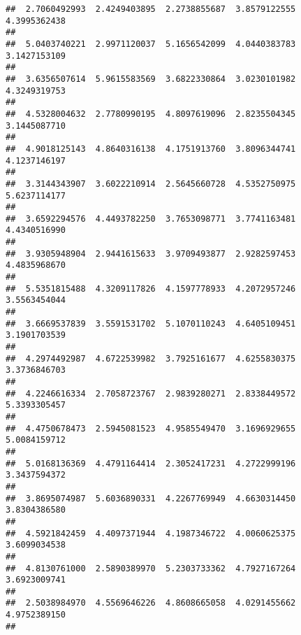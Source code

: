 \documentclass[]{article}
\begin{document}
\begin{verbatim}
##  2.7060492993  2.4249403895  2.2738855687  3.8579122555  4.3995362438 
##                                                                       
##  5.0403740221  2.9971120037  5.1656542099  4.0440383783  3.1427153109 
##                                                                       
##  3.6356507614  5.9615583569  3.6822330864  3.0230101982  4.3249319753 
##                                                                       
##  4.5328004632  2.7780990195  4.8097619096  2.8235504345  3.1445087710 
##                                                                       
##  4.9018125143  4.8640316138  4.1751913760  3.8096344741  4.1237146197 
##                                                                       
##  3.3144343907  3.6022210914  2.5645660728  4.5352750975  5.6237114177 
##                                                                       
##  3.6592294576  4.4493782250  3.7653098771  3.7741163481  4.4340516990 
##                                                                       
##  3.9305948904  2.9441615633  3.9709493877  2.9282597453  4.4835968670 
##                                                                       
##  5.5351815488  4.3209117826  4.1597778933  4.2072957246  3.5563454044 
##                                                                       
##  3.6669537839  3.5591531702  5.1070110243  4.6405109451  3.1901703539 
##                                                                       
##  4.2974492987  4.6722539982  3.7925161677  4.6255830375  3.3736846703 
##                                                                       
##  4.2246616334  2.7058723767  2.9839280271  2.8338449572  5.3393305457 
##                                                                       
##  4.4750678473  2.5945081523  4.9585549470  3.1696929655  5.0084159712 
##                                                                       
##  5.0168136369  4.4791164414  2.3052417231  4.2722999196  3.3437594372 
##                                                                       
##  3.8695074987  5.6036890331  4.2267769949  4.6630314450  3.8304386580 
##                                                                       
##  4.5921842459  4.4097371944  4.1987346722  4.0060625375  3.6099034538 
##                                                                       
##  4.8130761000  2.5890389970  5.2303733362  4.7927167264  3.6923009741 
##                                                                       
##  2.5038984970  4.5569646226  4.8608665058  4.0291455662  4.9752389150 
##                                                                       

\end{verbatim}
\end{document}
